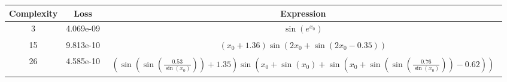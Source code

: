 \begin{center}
        \begin{tabular}{|c|c|c|}
        \hline
        Complexity & Loss & Expression \\
        \hline
        3 & 4.069e-09 & $\begin{aligned}\sin{\left(e^{x_{0}} \right)}\end{aligned}$\\ \hline15 & 9.813e-10 & $\begin{aligned}\left(x_{0} + 1.36\right) \sin{\left(2 x_{0} + \sin{\left(2 x_{0} - 0.35 \right)} \right)}\end{aligned}$\\ \hline26 & 4.585e-10 & $\begin{aligned}\left(\sin{\left(\sin{\left(\frac{0.53}{\sin{\left(x_{0} \right)}} \right)} \right)} + 1.35\right) \sin{\left(x_{0} + \sin{\left(x_{0} \right)} + \sin{\left(x_{0} + \sin{\left(\sin{\left(\frac{0.76}{\sin{\left(x_{0} \right)}} \right)} \right)} - 0.62 \right)} \right)}\end{aligned}$\\ \hline\end{tabular}
        \end{center}
        
